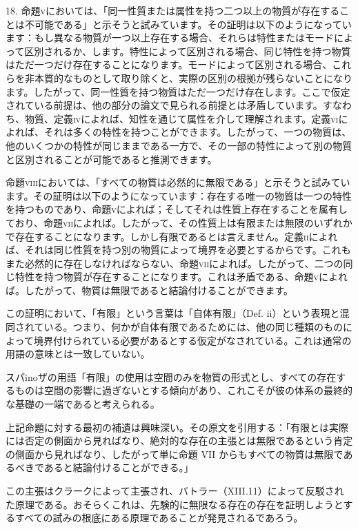 \documentclass[a4paper,11pt,openany]{ltjsbook}
\begin{document}
18. 命題\textsc{v}においては、「同一性質または属性を持つ二つ以上の物質が存在することは不可能である」と示そうと試みています。その証明は以下のようになっています：もし異なる物質が一つ以上存在する場合、それらは特性またはモードによって区別されるか、します。特性によって区別される場合、同じ特性を持つ物質はただ一つだけ存在することになります。モードによって区別される場合、これらを非本質的なものとして取り除くと、実際の区別の根拠が残らないことになります。したがって、同一性質を持つ物質はただ一つだけ存在します。ここで仮定されている前提は、他の部分の論文で見られる前提とは矛盾しています。すなわち、物質、定義\textsc{iv}によれば、知性を通じて属性を介して理解されます。定義\textsc{vi}によれば、それは多くの特性を持つことができます。したがって、一つの物質は、他のいくつかの特性が同じままである一方で、その一部の特性によって別の物質と区別されることが可能であると推測できます。

命題\textsc{viii}においては、「すべての物質は必然的に無限である」と示そうと試みています。その証明は以下のようになっています：存在する唯一の物質は一つの特性を持つものであり、命題\textsc{v}によれば；そしてそれは性質上存在することを属有しており、命題\textsc{vii}によれば。したがって、その性質上は有限または無限のいずれかで存在することになります。しかし有限であるとは言えません。定義\textsc{ii}によれば、それは同じ性質を持つ別の物質によって境界を必要とするからです。これもまた必然的に存在しなければならない、命題\textsc{vii}によれば。したがって、二つの同じ特性を持つ物質が存在することになります。これは矛盾である、命題\textsc{v}によれば。したがって、物質は無限であると結論付けることができます。

この証明において、「有限」という言葉は「自体有限」（Def. ii）という表現と混同されている。つまり、何かが自体有限であるためには、他の同じ種類のものによって境界付けられている必要があるとする仮定がなされている。これは通常の用語の意味とは一致していない。

スパinoザの用語「有限」の使用は空間のみを物質の形式とし、すべての存在するものは空間の影響に過ぎないとする傾向があり、これこそが彼の体系の最終的な基礎の一端であると考えられる。

上記命題に対する最初の補遺は興味深い。その原文を引用する：「有限とは実際には否定の側面から見ればなり、絶対的な存在の主張とは無限であるという肯定の側面から見ればなり、したがって単に命題 VII からもすべての物質は無限であるべきであると結論付けることができる。」

この主張はクラークによって主張され、バトラー（XIII.11）によって反駁された原理である。おそらくこれは、先験的に無限なる存在の存在を証明しようとするすべての試みの根底にある原理であることが発見されるであろう。
\end{document}
